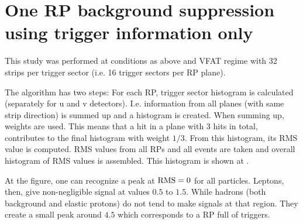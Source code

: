 
 

\section{One RP background suppression using trigger information only}

This study was performed at conditions as above and VFAT regime with 32 strips per trigger sector (i.e. 16 trigger sectors per RP plane).

The algorithm has two steps:
\bitm
\itm{} For each RP, trigger sector histogram is calculated (separately for u and v detectors). I.e. information from all planes (with same strip direction) is summed up and a histogram is created. When summing up, weights are used. This means that a hit in a plane with 3 hits in total, contributes to the final histogram with weight $1/3$. From this histogram, its RMS value is computed.
\itm{} RMS values from all RPs and all events are taken and overall histogram of RMS values is assembled. This histogram is shown at .
\eitm

At the figure, one can recognize a peak at ${\rm RMS} = 0$ for all particles. Leptons, then, give non-negligible signal at values $0.5$ to $1.5$. While hadrons (both background and elastic protons) do not tend to make signals at that region. They create a small peak around $4.5$ which corresponds to a RP full of triggers.

